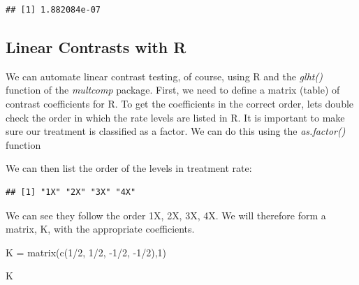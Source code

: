 \documentclass[
]{book}
\newenvironment{Shaded}{\begin{snugshade}}{\end{snugshade}}
\newcommand{\DecValTok}[1]{\textcolor[rgb]{0.00,0.00,0.81}{#1}}
\newcommand{\FunctionTok}[1]{\textcolor[rgb]{0.00,0.00,0.00}{#1}}
\newcommand{\NormalTok}[1]{#1}
\newcommand{\OtherTok}[1]{\textcolor[rgb]{0.56,0.35,0.01}{#1}}
\newcommand{\SpecialCharTok}[1]{\textcolor[rgb]{0.00,0.00,0.00}{#1}}
\begin{document}
\begin{verbatim}
## [1] 1.882084e-07
\end{verbatim}

\hypertarget{linear-contrasts-with-r}{%
\subsection{Linear Contrasts with R}\label{linear-contrasts-with-r}}

We can automate linear contrast testing, of course, using R and the \emph{glht()} function of the \emph{multcomp} package. First, we need to define a matrix (table) of contrast coefficients for R. To get the coefficients in the correct order, lets double check the order in which the rate levels are listed in R. It is important to make sure our treatment is classified as a factor. We can do this using the \emph{as.factor()} function

\begin{Shaded}
\end{Shaded}

We can then list the order of the levels in treatment rate:

\begin{Shaded}
\end{Shaded}

\begin{verbatim}
## [1] "1X" "2X" "3X" "4X"
\end{verbatim}

We can see they follow the order 1X, 2X, 3X, 4X. We will therefore form a matrix, K, with the appropriate coefficients.

\begin{Shaded}
\begin{Highlighting}[]
\NormalTok{K }\OtherTok{=} \FunctionTok{matrix}\NormalTok{(}\FunctionTok{c}\NormalTok{(}\DecValTok{1}\SpecialCharTok{/}\DecValTok{2}\NormalTok{, }\DecValTok{1}\SpecialCharTok{/}\DecValTok{2}\NormalTok{, }\SpecialCharTok{{-}}\DecValTok{1}\SpecialCharTok{/}\DecValTok{2}\NormalTok{, }\SpecialCharTok{{-}}\DecValTok{1}\SpecialCharTok{/}\DecValTok{2}\NormalTok{),}\DecValTok{1}\NormalTok{)}

\NormalTok{K}
\end{Highlighting}
\end{Shaded}
\end{document}
